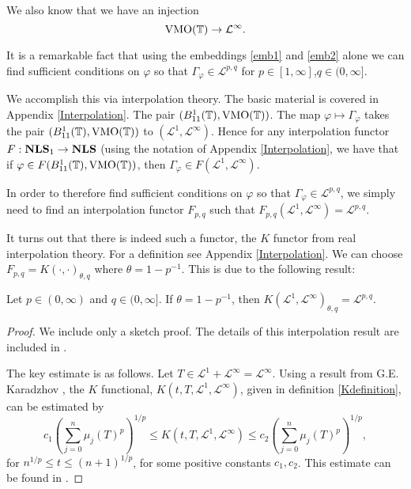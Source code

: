 We also know that we have an injection
\begin{equation}
\label{emb2}
    \VMO(\Circ) \to \mathcal{L}^\infty.
\end{equation}


It is a remarkable fact that using the embeddings \ref{emb1}
and \ref{emb2} alone we can find sufficient conditions on $\varphi$
so that $\Gamma_\varphi \in \mathcal{L}^{p,q}$ for $p\in [1,\infty]$,$q \in (0,\infty]$.

We accomplish this via interpolation theory.
The basic material is covered in Appendix \ref{Interpolation}. The pair $(B_{11}^1(\mathbb{T}),\operatorname{VMO}(\mathbb{T}))$.
The map $\varphi \mapsto \Gamma_\varphi$ takes the pair
$(B_{11}^1(\mathbb{T}),\operatorname{VMO}(\mathbb{T}))$ to $(\mathcal{L}^1,\mathcal{L}^\infty)$.
Hence for any interpolation functor $F:\mathrm{\mathbf{NLS}}_1\to\mathrm{\mathbf{NLS}}$ (using the notation
of Appendix \ref{Interpolation}, we have that if $\varphi \in F(B_{11}^1(\mathbb{T}),\operatorname{VMO}(\mathbb{T}))$,
then $\Gamma_{\varphi} \in F(\mathcal{L}^1,\mathcal{L}^\infty)$.

In order to therefore find sufficient conditions on $\varphi$ so that $\Gamma_\varphi \in \mathcal{L}^{p,q}$,
we simply need to find an interpolation functor $F_{p,q}$ such that $F_{p,q}(\mathcal{L}^1,\mathcal{L}^\infty) = \mathcal{L}^{p,q}$.

It turns out that there is indeed such a functor, the $K$ functor from real interpolation theory.
For a definition see Appendix \ref{Interpolation}. We can choose $F_{p,q} = K(\cdot,\cdot)_{\theta,q}$
where $\theta = 1-p^{-1}$. This is due to the following result:
\begin{proposition}
\label{LpqInterp}
    Let $p \in (0,\infty)$ and $q \in (0,\infty]$. If $\theta = 1-p^{-1}$, then $K(\mathcal{L}^1,\mathcal{L}^\infty)_{\theta,q} = \mathcal{L}^{p,q}$.
\end{proposition}
\begin{proof}
    We include only a sketch proof.
    The details of this interpolation result are included in \cite{DDP92}.
    
    The key estimate is as follows.
    Let $T \in \mathcal{L}^1+\mathcal{L}^\infty = \mathcal{L}^\infty$.
    Using a result from G.E. Karadzhov \cite{Karadzhov},
    the $K$ functional, $K(t,T,\mathcal{L}^1,\mathcal{L}^\infty)$, given in
    definition \ref{Kdefinition}, can be estimated by
    \begin{equation}
        c_1\left(\sum_{j=0}^n \mu_j(T)^p\right)^{1/p} \leq K(t,T,\mathcal{L}^1,\mathcal{L}^\infty) \leq c_2\left(\sum_{j=0}^n \mu_j(T)^p\right)^{1/p},
    \end{equation}
    for $n^{1/p} \leq t \leq (n+1)^{1/p}$, for some positive constants $c_1,c_2$. This
    estimate can be found in \cite{Karadzhov}.
\end{proof}



